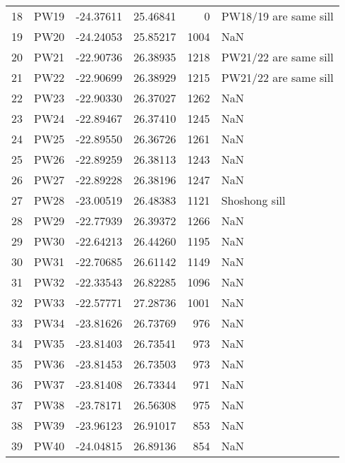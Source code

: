 \documentclass{article}
\begin{document}
{\begin{tabular}{llrrrl}
18 &  PW19 &   -24.37611 &     25.46841 &             0 &             PW18/19 are same sill \\
19 &  PW20 &   -24.24053 &     25.85217 &          1004 &                               NaN \\
20 &  PW21 &   -22.90736 &     26.38935 &          1218 &             PW21/22 are same sill \\
21 &  PW22 &   -22.90699 &     26.38929 &          1215 &             PW21/22 are same sill \\
22 &  PW23 &   -22.90330 &     26.37027 &          1262 &                               NaN \\
23 &  PW24 &   -22.89467 &     26.37410 &          1245 &                               NaN \\
24 &  PW25 &   -22.89550 &     26.36726 &          1261 &                               NaN \\
25 &  PW26 &   -22.89259 &     26.38113 &          1243 &                               NaN \\
26 &  PW27 &   -22.89228 &     26.38196 &          1247 &                               NaN \\
27 &  PW28 &   -23.00519 &     26.48383 &          1121 &                     Shoshong sill \\
28 &  PW29 &   -22.77939 &     26.39372 &          1266 &                               NaN \\
29 &  PW30 &   -22.64213 &     26.44260 &          1195 &                               NaN \\
30 &  PW31 &   -22.70685 &     26.61142 &          1149 &                               NaN \\
31 &  PW32 &   -22.33543 &     26.82285 &          1096 &                               NaN \\
32 &  PW33 &   -22.57771 &     27.28736 &          1001 &                               NaN \\
33 &  PW34 &   -23.81626 &     26.73769 &           976 &                               NaN \\
34 &  PW35 &   -23.81403 &     26.73541 &           973 &                               NaN \\
35 &  PW36 &   -23.81453 &     26.73503 &           973 &                               NaN \\
36 &  PW37 &   -23.81408 &     26.73344 &           971 &                               NaN \\
37 &  PW38 &   -23.78171 &     26.56308 &           975 &                               NaN \\
38 &  PW39 &   -23.96123 &     26.91017 &           853 &                               NaN \\
39 &  PW40 &   -24.04815 &     26.89136 &           854 &                               NaN \\
\bottomrule
\end{tabular}
}
\end{document}
